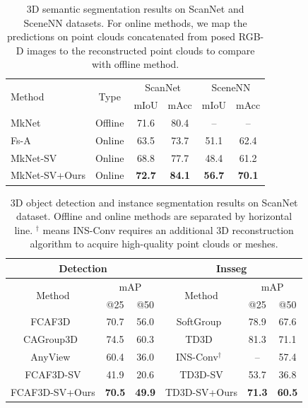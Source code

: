 \begin{table}[t]
    \setlength{\tabcolsep}{4pt}
    \centering
    \caption{3D semantic segmentation results on ScanNet and SceneNN datasets. For online methods, we map the predictions on point clouds concatenated from posed RGB-D images to the reconstructed point clouds to compare with offline method.}\label{tab1}
    \begin{tabular}{lc|cc|cc}  
        \toprule
        \multirow{2}{*}{Method} & \multirow{2}{*}{Type} & \multicolumn{2}{c|}{ScanNet} & \multicolumn{2}{c}{SceneNN} \\
        & & mIoU & mAcc & mIoU & mAcc \\
        \midrule
        MkNet~\cite{choy20194d} & Offline &71.6 &80.4 &-- &-- \\
        \midrule
        Fs-A~\cite{zhang2020fusion} & Online &63.5 &73.7 &51.1 &62.4 \\
        \rowcolor{mygray} MkNet-SV & Online &68.8 &77.7 &48.4 &61.2 \\
        \rowcolor{mygray} MkNet-SV+Ours & Online &\textbf{72.7} &\textbf{84.1} &\textbf{56.7} &\textbf{70.1} \\
        \bottomrule
    \end{tabular}
\end{table}

\begin{table}[t]
    \setlength{\tabcolsep}{4pt}
    \centering
    \small
    \caption{3D object detection and instance segmentation results on ScanNet dataset. Offline and online methods are separated by horizontal line. $^\dag$ means INS-Conv requires an additional 3D reconstruction algorithm to acquire high-quality point clouds or meshes.}\label{tab2}
    \begin{tabular}{c|cc|c|cc}  
        \toprule
        \multicolumn{3}{c|}{Detection} & \multicolumn{3}{c}{Insseg} \\
        \midrule
        \multirow{2}{*}{Method} & \multicolumn{2}{c|}{mAP} & \multirow{2}{*}{Method} & \multicolumn{2}{c}{mAP} \\
        & @25 & @50 & & @25 & @50 \\
        \midrule
        FCAF3D~\cite{rukhovich2022fcaf3d} &70.7 &56.0 &SoftGroup~\cite{vu2022softgroup} &78.9 &67.6 \\
        CAGroup3D~\cite{wang2022cagroup3d} &74.5 &60.3 &TD3D~\cite{kolodiazhnyi2023top} &81.3 &71.1 \\
        \midrule
        AnyView~\cite{wu2023anyview} &60.4 &36.0 &INS-Conv$^\dag$~\cite{liu2022ins} &-- &57.4 \\
        \rowcolor{mygray} FCAF3D-SV &41.9 &20.6 &TD3D-SV & 53.7 &36.8 \\
        \rowcolor{mygray} FCAF3D-SV+Ours &\textbf{70.5} &\textbf{49.9} &TD3D-SV+Ours & \textbf{71.3} & \textbf{60.5} \\
        \bottomrule
    \end{tabular}
\end{table}

